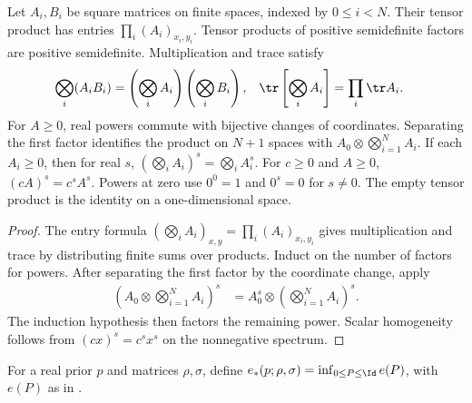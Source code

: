\begin{theorem}
    \label{thm:testing_tensor_calculus}
    \leanok
    Let $A_i,B_i$ be square matrices on finite spaces, indexed by $0\le i<N$.
    Their tensor product has entries $\prod_i(A_i)_{x_i,y_i}$.
    Tensor products of positive semidefinite factors are positive semidefinite.
    Multiplication and trace satisfy
    \begin{align}
        \bigotimes_i(A_iB_i)&=\left(\bigotimes_i A_i\right)
            \left(\bigotimes_i B_i\right),
        &\tr\left[\bigotimes_i A_i\right]&=\prod_i\tr A_i.
    \end{align}
    For $A\ge0$, real powers commute with bijective changes of coordinates.
    Separating the first factor identifies the product on $N+1$ spaces with
    $A_0\otimes\bigotimes_{i=1}^N A_i$. If each $A_i\ge0$, then for real $s$,
    $(\bigotimes_i A_i)^s=\bigotimes_i A_i^s$. For $c\ge0$ and $A\ge0$,
    $(cA)^s=c^sA^s$. Powers at zero use $0^0=1$ and $0^s=0$ for $s\ne0$.
    The empty tensor product is the identity on a one-dimensional space.
\end{theorem}
\begin{proof}
    \leanok
    The entry formula $(\bigotimes_i A_i)_{x,y}=\prod_i(A_i)_{x_i,y_i}$
    gives multiplication and trace by distributing finite sums over products.
    Induct on the number of factors for powers. After separating the first
    factor by the coordinate change, apply
    \begin{align}
        \left(A_0\otimes\bigotimes_{i=1}^N A_i\right)^s
          &=A_0^s\otimes\left(\bigotimes_{i=1}^N A_i\right)^s.
    \end{align}
    The induction hypothesis then factors the remaining power.
    Scalar homogeneity follows from $(cx)^s=c^sx^s$ on the nonnegative spectrum.
\end{proof}

\begin{definition}
    \label{def:optimal_testing_error}
    \leanok
    For a real prior $p$ and matrices $\rho,\sigma$, define
    $e_*(p;\rho,\sigma)=\inf_{0\le P\le\Id}e(P)$, with $e(P)$ as in
    \cite[Equation~(8.40)]{Wolf2012Quantum}.
\end{definition}

